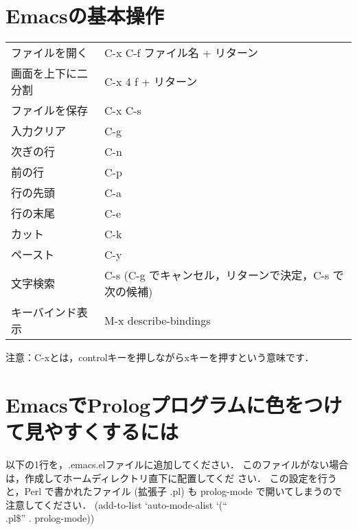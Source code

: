 \documentclass[a4j]{article}
\begin{document}
\section*{Emacsの基本操作}
\label{sec-8}


\begin{center}
\begin{tabular}{ll}
\hline
 ファイルを開く      &  C-x C-f ファイル名 + リターン                           \\
 画面を上下に二分割  &  C-x 4 f + リターン                                      \\
 ファイルを保存      &  C-x C-s                                                 \\
 入力クリア          &  C-g                                                     \\
 次ぎの行            &  C-n                                                     \\
 前の行              &  C-p                                                     \\
 行の先頭            &  C-a                                                     \\
 行の末尾            &  C-e                                                     \\
 カット              &  C-k                                                     \\
 ペースト            &  C-y                                                     \\
 文字検索            &  C-s (C-g でキャンセル，リターンで決定，C-s で次の候補)  \\
 キーバインド表示    &  M-x describe-bindings                                   \\
\hline
\end{tabular}
\end{center}


注意：C-xとは，controlキーを押しながらxキーを押すという意味です．
\section*{EmacsでPrologプログラムに色をつけて見やすくするには}
\label{sec-9}

以下の1行を，.emacs.elファイルに追加してください． このファイルがない場合は，作成してホームディレクトリ直下に配置してくだ さい． この設定を行うと，Perl で書かれたファイル (拡張子 .pl) も prolog-mode で開いてしまうので注意してください．
(add-to-list `auto-mode-alist `(``\\.pl\$'' . prolog-mode))
\end{document}
